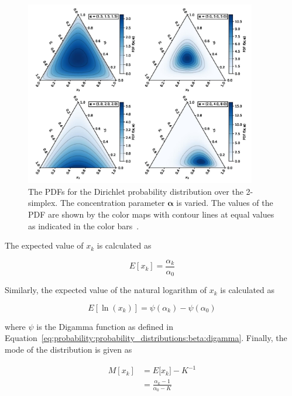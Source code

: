 \begin{figure}[htb]
      \centering
      \includegraphics[width=0.9\textwidth]{images/dirichlet.pdf}
      \caption{The \acfp{PDF} for the Dirichlet probability distribution over the 2-simplex. The concentration parameter $\boldsymbol{\alpha}$ is varied. The values of the \acs{PDF} are shown by the color maps with contour lines at equal values as indicated in the color bars~\cite{ref:dirichlet:2020}.}
      \label{fig:probability:probability_distributions:dirichlet}
\end{figure}

The expected value of $x_{k}$ is calculated as

\begin{equation}
      \label{eq:probability:probability_distributions:dirichlet:expected_value}
      E[x_{k}] = \frac{\alpha_{k}}{\alpha_{0}}
\end{equation}

Similarly, the expected value of the natural logarithm of $x_{k}$ is calculated as

\begin{equation}
      \label{eq:probability:probability_distributions:dirichlet:expected_value_ln}
      E[\ln(x_{k})] = \psi({\alpha_{k}}) - \psi(\alpha_{0})
\end{equation}

where $\psi$ is the Digamma function as defined in Equation~\eqref{eq:probability:probability_distributions:beta:digamma}. Finally, the mode of the distribution is given as

\begin{equation}
      \label{eq:probability:probability_distributions:dirichlet:mode}
      \begin{split}
            M[x_{k}] &= E[{x_{k}] -K^{-1}} \\
            &=  \frac{\alpha_{k} - 1}{\alpha_{0} - K}
      \end{split}
\end{equation}


